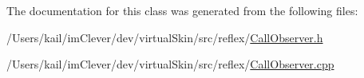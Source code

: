 The documentation for this class was generated from the following files:\begin{DoxyCompactItemize}
\item 
/Users/kail/imClever/dev/virtualSkin/src/reflex/\hyperlink{_call_observer_8h}{CallObserver.h}\item 
/Users/kail/imClever/dev/virtualSkin/src/reflex/\hyperlink{_call_observer_8cpp}{CallObserver.cpp}\end{DoxyCompactItemize}
